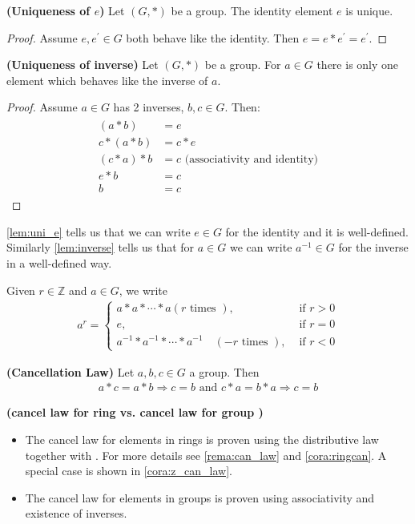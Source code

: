 \documentclass{article}
\newcommand{\bfs}[1]{\textbf{({#1}) }}
\begin{document}
\begin{thma}{\bfs{Uniqueness of $e$}}\label{lem:uni_e}
Let $(G, *)$ be a group. The identity element $e$ is unique.
\end{thma}
\begin{proof}
 Assume $e, e^{\prime} \in G$ both behave like the identity. Then $e=e * e^{\prime}=e^{\prime}$.
\end{proof}
\begin{thma}{\bfs{Uniqueness of inverse}}\label{lem:inverse}
Let $(G, *)$ be a group. For $a \in G$ there is only one element which behaves like the inverse of $a$.
\end{thma}
\begin{proof}
 Assume $a \in G$ has 2 inverses, $b, c \in G$. Then:
\begin{align*}
\begin{aligned}
(a * b) &=e \\
c *(a * b) &=c * e\\
(c * a) * b&=c \text{ (associativity and identity)}\\
e * b &=c \\
b &=c
\end{aligned}
\end{align*}
\end{proof}

\begin{rema}
\cref{lem:uni_e} tells us that we can write $e \in G$ for the identity and it is well-defined. Similarly \cref{lem:inverse} tells us that for $a \in G$ we can write $a^{-1} \in G$ for the inverse in a well-defined way. 
\end{rema}

Given $r \in \mathbb{Z}$ and $a \in G$, we write
\begin{align*}
a^{r}= \begin{cases}a * a * \cdots * a(r \text { times }), & \text { if } r>0 \\ e, & \text { if } r=0 \\ a^{-1} * a^{-1} * \cdots * a^{-1} \quad(-r \text { times }), & \text { if } r<0\end{cases}
\end{align*}
\begin{thma}{\bfs{Cancellation Law}} Let $a, b, c \in G$ a group. Then
\begin{align*}
a * c=a * b \Rightarrow c=b \text { and } c * a=b * a \Rightarrow c=b
\end{align*}
\end{thma}
\begin{rema}{\bfs{cancel law for ring vs. cancel law for group }}\label{rem:dinfdaf}

\begin{itemize}
    \item The cancel law for elements in rings is proven using the distributive law together with . For more details see \cref{rema:can_law} and \cref{cora:ringcan}. A special case is shown in \cref{cora:z_can_law}.
    \item The cancel law for elements in groups is proven using associativity and existence of inverses.
\end{itemize}
\end{rema}
\end{document}
